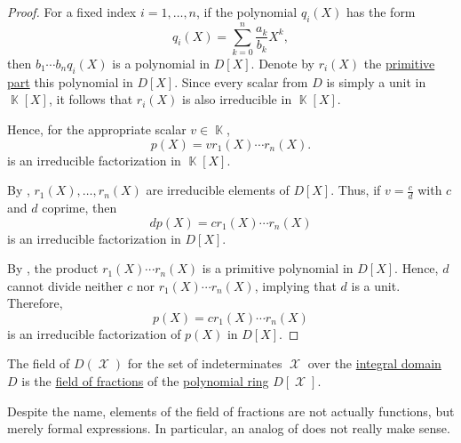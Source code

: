 \begin{proof}
  For a fixed index \( i = 1, \ldots, n \), if the polynomial \( q_i(X) \) has the form
  \begin{equation*}
    q_i(X) = \sum_{k=0}^n \frac {a_k} {b_k} X^k,
  \end{equation*}
  then \( b_1 \cdots b_n q_i(X) \) is a polynomial in \( D[X] \). Denote by \( r_i(X) \) the \hyperref[def:polynomial_content]{primitive part} this polynomial in \( D[X] \). Since every scalar from \( D \) is simply a unit in \( \BbbK[X] \), it follows that \( r_i(X) \) is also irreducible in \( \BbbK[X] \).

  Hence, for the appropriate scalar \( v \in \BbbK \),
  \begin{equation*}
    p(X) = v r_1(X) \cdots r_n(X).
  \end{equation*}
  is an irreducible factorization in \( \BbbK[X] \).

  By , \( r_1(X), \ldots, r_n(X) \) are irreducible elements of \( D[X] \). Thus, if \( v = \tfrac c d \) with \( c \) and \( d \) coprime, then
  \begin{equation*}
    d p(X) = c r_1(X) \cdots r_n(X)
  \end{equation*}
  is an irreducible factorization in \( D[X] \).

  By , the product \( r_1(X) \cdots r_n(X) \) is a primitive polynomial in \( D[X] \). Hence, \( d \) cannot divide neither \( c \) nor \( r_1(X) \cdots r_n(X) \), implying that \( d \) is a unit. Therefore,
  \begin{equation*}
    p(X) = c r_1(X) \cdots r_n(X)
  \end{equation*}
  is an irreducible factorization of \( p(X) \) in \( D[X] \).
\end{proof}

\begin{definition}\label{def:rational_function_field}
  The field of  \( D(\mscrX) \) for the set of indeterminates \( \mscrX \) over the \hyperref[def:integral_domain]{integral domain} \( D \) is the \hyperref[thm:field_of_fractions]{field of fractions} of the \hyperref[def:polynomial_semiring]{polynomial ring} \( D[\mscrX] \).

  Despite the name, elements of the field of fractions are not actually functions, but merely formal expressions. In particular, an analog of  does not really make sense.
\end{definition}

